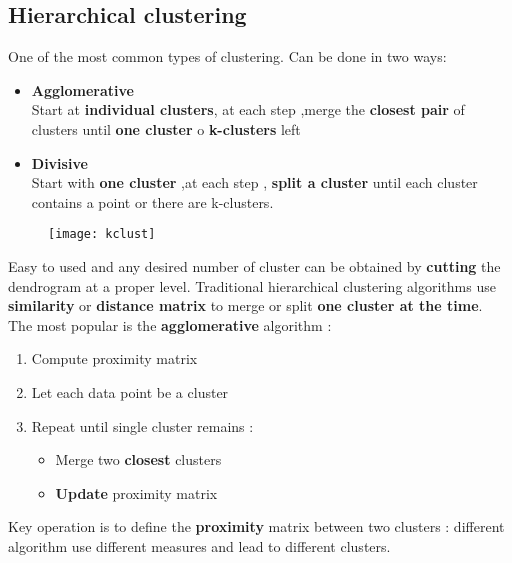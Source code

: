 \subsection{Hierarchical clustering}
One of the most common types of clustering. Can be done in two ways:
\begin{itemize}
\item \textbf{Agglomerative}\\
Start at \textbf{individual clusters}, at each step ,merge the \textbf{closest pair} of clusters until \textbf{one cluster} o \textbf{k-clusters} left
\item \textbf{Divisive}\\
Start with \textbf{one cluster} ,at each step , \textbf{split a cluster} until each cluster contains a point or there are k-clusters.
\end{itemize}
\begin{figure}[H]
  \centering
  \texttt{[image: kclust]}
\end{figure}
Easy to used and any desired number of cluster can be obtained by \textbf{cutting} the dendrogram at a proper level. Traditional hierarchical clustering algorithms use \textbf{similarity} or \textbf{distance matrix} to merge or split \textbf{one cluster at the time}.\\
The most popular is the \textbf{agglomerative} algorithm :
\begin{enumerate}
\item Compute proximity matrix
\item Let each data point be a cluster
\item Repeat until single cluster remains :
\begin{itemize}
\item Merge two \textbf{closest} clusters
\item \textbf{Update} proximity matrix
\end{itemize}
\end{enumerate}
Key operation is to define the \textbf{proximity} matrix between two clusters : different algorithm use different measures and lead to different clusters.

